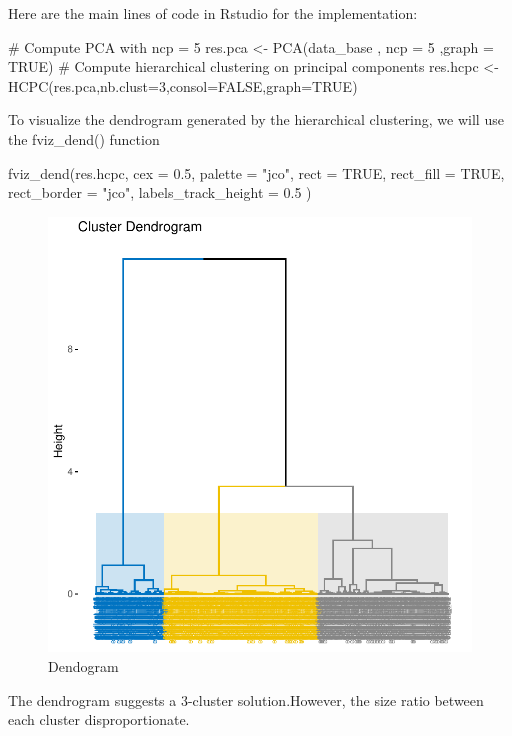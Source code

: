 \documentclass[12pt]{article}
\begin{document}
Here are the main lines of code in Rstudio for the implementation:

\begin{customFrame}
# Compute PCA with ncp = 5
res.pca <- PCA(data_base , ncp = 5 ,graph = TRUE)
# Compute hierarchical clustering on principal components
res.hcpc <- HCPC(res.pca,nb.clust=3,consol=FALSE,graph=TRUE)
\end{customFrame}


To visualize the dendrogram generated by the hierarchical clustering, we will use the fviz\_dend() function

\begin{customFrame}
fviz_dend(res.hcpc, 
          cex = 0.5,                    
          palette = "jco",               
          rect = TRUE, rect_fill = TRUE, 
          rect_border = "jco",           
          labels_track_height = 0.5 )
\end{customFrame}

\begin{figure}[H]
\begin{center}
\includegraphics[scale=1.]{dentogram.pdf} 
\caption[]{Dendogram }
\end{center}
\end{figure}

The dendrogram suggests a 3-cluster solution.However, the size ratio between each cluster disproportionate.
\end{document}
